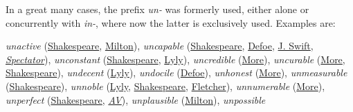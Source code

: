 \bigskip

In a great many cases, the prefix \textit{un-} was formerly used, either alone or concurrently with \textit{in-}, where now the latter is exclusively used. Examples are:

\bigskip
\setlength{\leftskip}{1.55em}\noindent
    \textit{unactive} (\href{https://internetshakespeare.uvic.ca/doc/Cor_F1/index.html#tln-100}{Shakespeare}, \href{https://archive.org/details/poeticalworksofj00miltiala/page/466/mode/2up?ref=ol&view=theater&q=unactive}{Milton}), \textit{uncapable} (\href{https://internetshakespeare.uvic.ca/doc/Oth_F1/scene/4.2/index.html#tln-2945}{Shakespeare}, \href{https://archive.org/details/fartheradventure00defo/page/180/mode/2up?q=%22uncapable%22&view=theater}{Defoe}, \href{https://archive.org/details/bim_eighteenth-century_the-works-of-j-s-dd-_swift-jonathan_1735_3/page/62/mode/2up?view=theater&q=%22uncapable%22}{J. Swift}, \href{https://archive.org/details/spectatornewedre00addiuoft/page/294/mode/2up?q=%22uncapable%22&view=theater}{\textit{Spectator}}), \textit{unconstant} (\href{https://internetshakespeare.uvic.ca/doc/Lr_F1/scene/1.1/index.html#tln-325}{Shakespeare}, \href{https://archive.org/details/bim_early-english-books-1475-1640_campaspe-played-beefore-_lyly-john_1591/page/14/mode/2up?q=vnconstant&view=theater}{Lyly}), \textit{uncredible} (\href{https://archive.org/details/utopiasirthomas00robigoog/page/n285/mode/2up?q=vncredible&view=theater}{More}), \textit{uncurable} (\href{https://archive.org/details/utopiasirthomas00robigoog/page/n333/mode/2up?q=vncurable&view=theater}{More}, \href{https://internetshakespeare.uvic.ca/doc/2H6_F1/scene/3.1/index.html#tln-1585}{Shakespeare}), \textit{undecent} (\href{https://archive.org/details/bim_early-english-books-1475-1640_campaspe-played-beefore-_lyly-john_1591/page/n31/mode/2up?q=vndecent&view=theater}{Lyly}), \textit{undocile} (\href{https://ia800900.us.archive.org/29/items/compleatenglishg00deforich/compleatenglishg00deforich.pdf}{Defoe}), \textit{unhonest} (\href{https://archive.org/details/utopiasirthomas00robigoog/page/n203/mode/2up?q=vnhonest&view=theater}{More}), \textit{unmeasurable} (\href{https://internetshakespeare.uvic.ca/doc/Wiv_F1/scene/2.1/index.html#tln-645}{Shakespeare}), \textit{unnoble} (\href{https://archive.org/details/bim_early-english-books-1475-1640_campaspe-played-beefore-_lyly-john_1591/page/n15/mode/2up?q=vnnoble&view=theater}{Lyly}, \href{https://internetshakespeare.uvic.ca/doc/Ant_F1/scene/3.11/index.html#tln-2075}{Shakespeare}, \href{https://archive.org/details/b30527892_0005/page/2776/mode/2up?q=unnoble&view=theater}{Fletcher}), \textit{unnumerable} (\href{https://archive.org/details/utopiasirthomas00robigoog/page/n159/mode/2up?q=vnnumerable&view=theater}{More}), \textit{unperfect} (\href{https://internetshakespeare.uvic.ca/doc/Son_Q1/page/14/index.html#tln-330}{Shakespeare}, \href{https://www.kingjamesbibleonline.org/Psalms-139-16/}{\textit{AV}}), \textit{unplausible} (\href{https://archive.org/details/areopagitica00miltuoft/page/54/mode/2up?q=%22unplausible%22&view=theater}{Milton}), \textit{unpossible} 